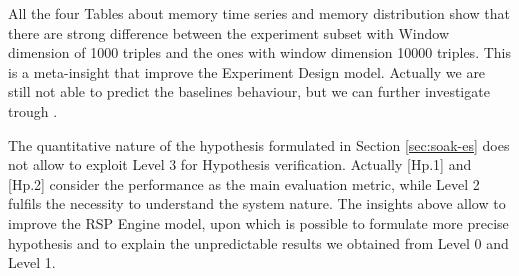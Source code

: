 All the four Tables about memory time series and memory distribution show that there are strong difference between the experiment subset with Window dimension of 1000  triples and the ones with window dimension 10000 triples. This is a meta-insight that improve the Experiment Design model. Actually we are still not able to predict the baselines behaviour, but we can further investigate trough \namens.

The quantitative nature of the hypothesis formulated in Section \ref{sec:soak-es} does not allow to exploit Level 3 for Hypothesis verification. Actually [Hp.1] and [Hp.2] consider the performance as the main evaluation metric, while Level 2 fulfils the necessity to understand the system nature. The insights above allow to improve the RSP Engine model, upon which is possible to formulate more precise hypothesis and to explain the unpredictable results we obtained from Level 0 and Level 1.













